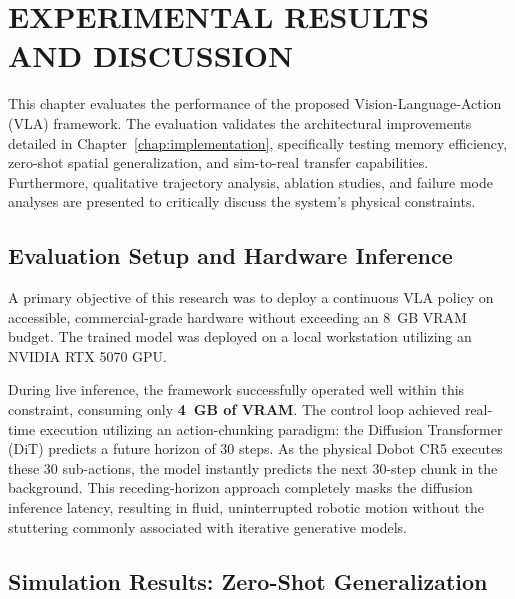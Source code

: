 
\chapter{EXPERIMENTAL RESULTS AND DISCUSSION}
\label{chap:results}

This chapter evaluates the performance of the proposed Vision-Language-Action (VLA) framework. The evaluation validates the architectural improvements detailed in Chapter~\ref{chap:implementation}, specifically testing memory efficiency, zero-shot spatial generalization, and sim-to-real transfer capabilities. Furthermore, qualitative trajectory analysis, ablation studies, and failure mode analyses are presented to critically discuss the system's physical constraints.

\section{Evaluation Setup and Hardware Inference}
\label{sec:eval_setup}

A primary objective of this research was to deploy a continuous VLA policy on accessible, commercial-grade hardware without exceeding an 8~GB VRAM budget. The trained model was deployed on a local workstation utilizing an NVIDIA RTX 5070 GPU. 

During live inference, the framework successfully operated well within this constraint, consuming only \textbf{4~GB of VRAM}. The control loop achieved real-time execution utilizing an action-chunking paradigm: the Diffusion Transformer (DiT) predicts a future horizon of 30 steps. As the physical Dobot CR5 executes these 30 sub-actions, the model instantly predicts the next 30-step chunk in the background. This receding-horizon approach completely masks the diffusion inference latency, resulting in fluid, uninterrupted robotic motion without the stuttering commonly associated with iterative generative models.

\section{Simulation Results: Zero-Shot Generalization}
\label{sec:sim_results}

